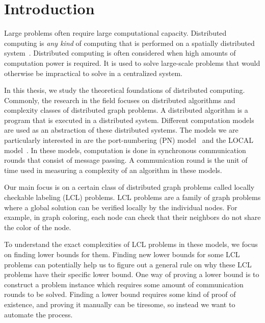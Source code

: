 
\section{Introduction}  \label{sec:introduction}

Large problems often require large computational capacity.
Distributed computing is \emph{any kind} of computing that is performed on a spatially distributed system~\cite{DBLP:books/el/leeuwen90/LamportL90}.
Distributed computing is often considered when high amounts of computation power is required.
It is used to solve large-scale problems that would otherwise be impractical to solve in a centralized system.

In this thesis, we study the theoretical foundations of distributed computing.
Commonly, the research in the field focuses on distributed algorithms and complexity classes of distributed graph problems.
A distributed algorithm is a program that is executed in a distributed system.
Different computation models are used as an abstraction of these distributed systems.
The models we are particularly interested in are the port-numbering (PN) model~\cite{DBLP:conf/stoc/Angluin80} and the LOCAL model~\cite{DBLP:conf/focs/Linial87}.
In these models, computation is done in synchronous communication rounds that consist of message passing.
A communication round is the unit of time used in measuring a complexity of an algorithm in these models.

Our main focus is on a certain class of distributed graph problems called locally checkable labeling (LCL) problems.
LCL problems are a family of graph problems where a global solution can be verified locally by the individual nodes.
For example, in graph coloring, each node can check that their neighbors do not share the color of the node.


To understand the exact complexities of LCL problems in these models, we focus on finding lower bounds for them.
Finding new lower bounds for some LCL problems can potentially help us to figure out a general rule on why these LCL problems have their specific lower bound.
One way of proving a lower bound is to construct a problem instance which requires some amount of communication rounds to be solved.
Finding a lower bound requires some kind of proof of existence, and proving it manually can be tiresome, so instead we want to automate the process.

